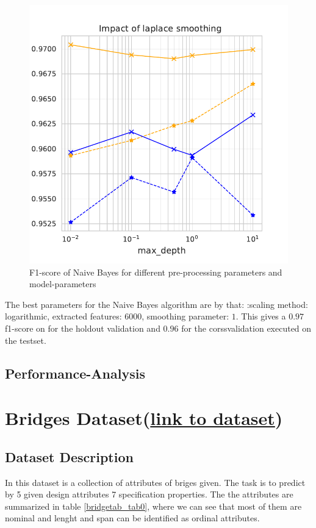 \documentclass[11pt]{article}
\begin{document}
\begin{figure}
\begin{minipage}[l]{0.3\textwidth}
\end{minipage}
\begin{minipage}[l]{0.3\textwidth}
\includegraphics[width=1\linewidth]{email_spam/nb_smoother.pdf}
\end{minipage}
   \caption{F1-score of Naive Bayes for different pre-processing parameters and model-parameters}
\label{spamfig_fig3}
\end{figure}

The best parameters for the Naive Bayes algorithm are by that: :scaling method: logarithmic, extracted features: $6000$, smoothing parameter: $1$. This gives a $0.97$ f1-score on for the holdout validation and $0.96$ for the corssvalidation executed on the testset.


\subsection{Performance-Analysis}


\section{Bridges Dataset(\href{https://archive.ics.uci.edu/ml/datasets/Pittsburgh+Bridges}{link to dataset})}
\subsection{Dataset Description}
In this dataset is a collection of attributes of briges given. The task is to predict by 5 given design attributes 7 specification properties. The the attributes are summarized in table \ref{bridgetab_tab0}, where we can see that most of them are nominal and lenght and span can be identified as ordinal attributes.
\end{document}
